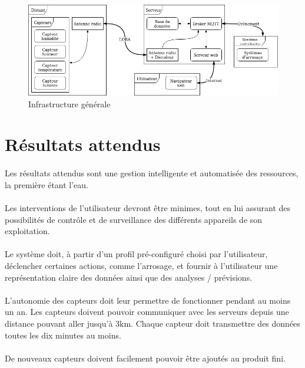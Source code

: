 \documentclass[11pt,a4paper]{article}
\begin{document}
\begin{figure}
	\begin{centering}
	\includegraphics[scale=0.5]{graph.png}
	\end{centering}
	\caption{Infrastructure générale}
\end{figure}

\section{Résultats attendus}

\paragraph{}Les résultats attendus sont une gestion intelligente et automatisée des ressources, la première étant l'eau.
\paragraph{}Les interventions de l'utilisateur devront être minimes, tout en lui assurant des possibilités de contrôle et de surveillance des différents appareils de son exploitation.
\paragraph{}Le système doit, à partir d'un profil pré-configuré choisi par l'utilisateur, déclencher certaines actions, comme l'arrosage, et fournir à l'utilisateur une représentation claire des données ainsi que des analyses / prévisions.
\paragraph{}L'autonomie des capteurs doit leur permettre de fonctionner pendant au moins un an. Les capteurs doivent pouvoir communiquer avec les serveurs depuis une distance pouvant aller jusqu'à 3km. Chaque capteur doit transmettre des données toutes les dix minutes au moins.
\paragraph{}De nouveaux capteurs doivent facilement pouvoir être ajoutés au produit fini.
\end{document}
